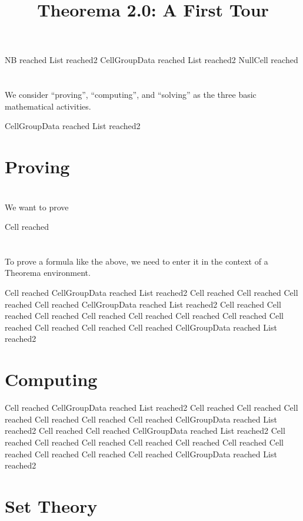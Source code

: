 \documentclass{article}
\newcommand{\light}[1]{{\color{lightgray}#1}}
\begin{document}
% 

\title{Theorema 2.0: A First Tour}
\author{}
\date{}
\maketitle

\light{NB reached} \light{List reached2} \light{CellGroupData reached} \light{List reached2} Null\light{Cell reached} \begingroup \section*{} We consider “proving”, “computing”, and “solving” as the three basic mathematical activities.\endgroup 

\light{CellGroupData reached} \light{List reached2} \section{Proving}

\begingroup \section*{} We want to prove\endgroup 

\light{Cell reached} \begingroup \section*{} To prove a formula like the above, we need to enter it in the context of a Theorema environment.\endgroup 

\light{Cell reached} \light{CellGroupData reached} \light{List reached2} \light{Cell reached} \light{Cell reached} \light{Cell reached} \light{Cell reached} \light{CellGroupData reached} \light{List reached2} \light{Cell reached} \light{Cell reached} \light{Cell reached} \light{Cell reached} \light{Cell reached} \light{Cell reached} \light{Cell reached} \light{Cell reached} \light{Cell reached} \light{Cell reached} \light{Cell reached} \light{CellGroupData reached} \light{List reached2} \section{Computing}

\light{Cell reached} \light{CellGroupData reached} \light{List reached2} \light{Cell reached} \light{Cell reached} \light{Cell reached} \light{Cell reached} \light{Cell reached} \light{Cell reached} \light{CellGroupData reached} \light{List reached2} \light{Cell reached} \light{Cell reached} \light{CellGroupData reached} \light{List reached2} \light{Cell reached} \light{Cell reached} \light{Cell reached} \light{Cell reached} \light{Cell reached} \light{Cell reached} \light{Cell reached} \light{Cell reached} \light{Cell reached} \light{Cell reached} \light{CellGroupData reached} \light{List reached2} \section{Set Theory}
\end{document}

